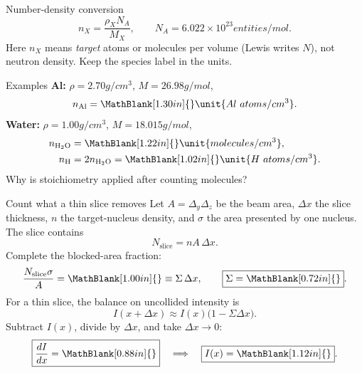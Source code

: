 \begin{handoutcolumns}

\begin{fixedbox}{Number-density conversion}
\[
 \boxed{n_X=\frac{\rho_XN_A}{M_X}},
 \qquad N_A=6.022\times10^{23}\unit{entities/mol}.
\]
Here $n_X$ means \emph{target} atoms or molecules per volume (Lewis writes
$N$), not neutron density. Keep the species label in the units.
\end{fixedbox}

\begin{boardbox}{Examples}
\footnotesize
\textbf{Al:} $\rho=2.70\unit{g/cm^3}$, $M=26.98\unit{g/mol}$,
\[
 n_{\mathrm{Al}}=\MathBlank[1.30in]{}
 \unit{Al\ atoms/cm^3}.
\]
\textbf{Water:} $\rho=1.00\unit{g/cm^3}$, $M=18.015\unit{g/mol}$,
\[
 \begin{aligned}
 n_{\mathrm{H_2O}}&=\MathBlank[1.22in]{}
   \unit{molecules/cm^3},\\
 n_{\mathrm H}&=2n_{\mathrm{H_2O}}
   =\MathBlank[1.02in]{}
   \unit{H\ atoms/cm^3}.
 \end{aligned}
\]
Why is stoichiometry applied after counting molecules?
\normalsize
\end{boardbox}


\switchcolumn


\begin{boardbox}{Count what a thin slice removes}
Let $A=\Delta_y\Delta_z$ be the beam area, $\Delta x$ the slice thickness,
$n$ the target-nucleus density, and $\sigma$ the area presented by one
nucleus. The slice contains
\[
 N_{\mathrm{slice}}=nA\,\Delta x.
\]
Complete the blocked-area fraction:
\[
 \frac{N_{\mathrm{slice}}\sigma}{A}
 =\MathBlank[1.00in]{}
 \equiv\Sigma\,\Delta x,
 \qquad \boxed{\Sigma=\MathBlank[0.72in]{}}.
\]
For a thin slice, the balance on uncollided intensity is
\[
 I(x+\Delta x)\approx I(x)\bigl(1-\Sigma\Delta x\bigr).
\]
Subtract $I(x)$, divide by $\Delta x$, and take $\Delta x\to0$:
\[
 \boxed{\frac{dI}{dx}=\MathBlank[0.88in]{}}
 \quad\Longrightarrow\quad
 \boxed{I(x)=\MathBlank[1.12in]{}}.
\]
\end{boardbox}


\end{handoutcolumns}
